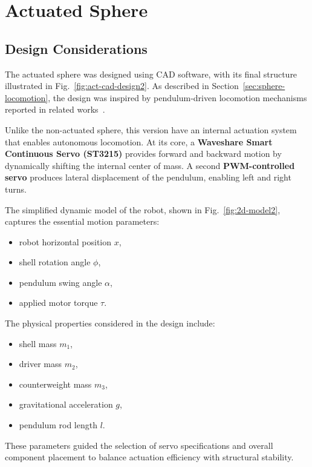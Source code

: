 \documentclass[english, bachelor, utf8]{base/thesis_telematics}
\begin{document}
\section{Actuated Sphere}
\subsection{Design Considerations}
The actuated sphere was designed using CAD software, with its final structure illustrated in Fig.~\ref{fig:act-cad-design2}. As described in Section~\ref{sec:sphere-locomotion}, the design was inspired by pendulum-driven locomotion mechanisms reported in related works~\cite{roboball, novelsphere}.  

Unlike the non-actuated sphere, this version have an internal actuation system that enables autonomous locomotion.
At its core, a \textbf{Waveshare Smart Continuous Servo (ST3215)} provides forward and backward motion by dynamically shifting the internal center of mass. 
A second \textbf{PWM-controlled servo} produces lateral displacement of the pendulum, enabling left and right turns.  



The simplified dynamic model of the robot, shown in Fig.~\ref{fig:2d-model2}, captures the essential motion parameters:  
\begin{itemize}
    \item robot horizontal position \( x \),  
    \item shell rotation angle \( \phi \),  
    \item pendulum swing angle \( \alpha \),  
    \item applied motor torque \( \tau \).  
\end{itemize}

The physical properties considered in the design include:  
\begin{itemize}
    \item shell mass \( m_1 \),  
    \item driver mass \( m_2 \),  
    \item counterweight mass \( m_3 \),  
    \item gravitational acceleration \( g \),  
    \item pendulum rod length \( l \).  
\end{itemize}

These parameters guided the selection of servo specifications and overall component placement to balance actuation efficiency with structural stability.  
\end{document}
